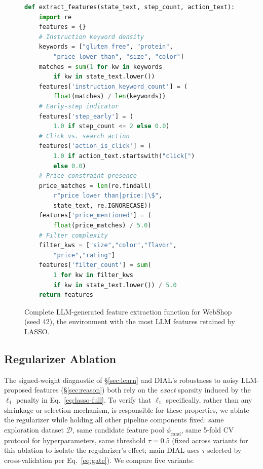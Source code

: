 \begin{figure}[h]
\begin{tcolorbox}[
    title=\textbf{LLM Output for WebShop},
    colframe=PTGreenDark,
    colback=PTLightGreen,
    colbacktitle=PTGreenDark,
    coltitle=white,
    fonttitle=\bfseries,
    boxrule=0.9pt,
    arc=0pt,
    left=7pt,right=7pt,top=4pt,bottom=4pt,
    width=\columnwidth
  ]
\begin{lstlisting}[language=Python,basicstyle=\ttfamily\scriptsize,
  breaklines=true,columns=fullflexible,
  keywordstyle=\color{blue},commentstyle=\color{gray},
  showstringspaces=false]
def extract_features(state_text, step_count, action_text):
    import re
    features = {}
    # Instruction keyword density
    keywords = ["gluten free", "protein",
        "price lower than", "size", "color"]
    matches = sum(1 for kw in keywords
        if kw in state_text.lower())
    features['instruction_keyword_count'] = (
        float(matches) / len(keywords))
    # Early-step indicator
    features['step_early'] = (
        1.0 if step_count <= 2 else 0.0)
    # Click vs. search action
    features['action_is_click'] = (
        1.0 if action_text.startswith("click[")
        else 0.0)
    # Price constraint presence
    price_matches = len(re.findall(
        r"price lower than|price:|\$",
        state_text, re.IGNORECASE))
    features['price_mentioned'] = (
        float(price_matches) / 5.0)
    # Filter complexity
    filter_kws = ["size","color","flavor",
        "price","rating"]
    features['filter_count'] = sum(
        1 for kw in filter_kws
        if kw in state_text.lower()) / 5.0
    return features
\end{lstlisting}
\end{tcolorbox}
\caption{Complete LLM-generated feature extraction function for WebShop (seed 42), the environment with the most LLM features retained by LASSO.}
\label{fig:llm-output-webshop}
\end{figure}

\subsection{Regularizer Ablation}
\label{app:regularizer-ablation}

The signed-weight diagnostic of \S\ref{sec:learn} and DIAL's
robustness to noisy LLM-proposed features (\S\ref{sec:reason})
both rely on the \emph{exact} sparsity induced by the $\ell_1$
penalty in Eq.~\eqref{eq:lasso-full}. To verify that $\ell_1$
specifically, rather than any shrinkage or selection mechanism,
is responsible for these properties, we ablate the regularizer
while holding all other pipeline components fixed: same
exploration dataset $\mathcal{D}$, same candidate feature pool
$\phi_{\text{cand}}$, same 5-fold CV protocol for hyperparameters,
same threshold $\tau{=}0.5$ (fixed across variants for this
ablation to isolate the regularizer's effect; main DIAL uses
$\tau$ selected by cross-validation per Eq.~\eqref{eq:gate}). We compare five variants:

